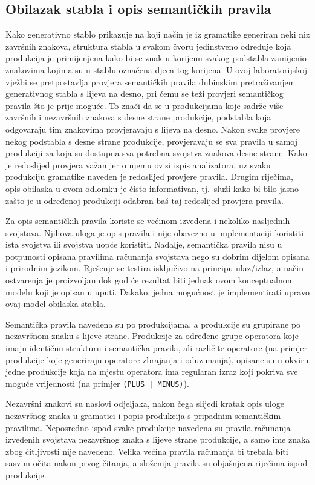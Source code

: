 \documentclass[times, 12pt, utf8]{book}
\begin{document}
\subsection{Obilazak stabla i opis semantičkih pravila}\label{sec:obilazak}
Kako generativno stablo prikazuje na koji način je iz gramatike generiran neki niz završnih znakova, struktura stabla u svakom čvoru jedinstveno određuje koja produkcija je primijenjena kako bi se znak u korijenu svakog podstabla zamijenio znakovima kojima su u stablu označena djeca tog korijena.
U ovoj laboratorijskoj vježbi se pretpostavlja provjera semantičkih pravila dubinskim pretraživanjem generativnog stabla s lijeva na desno, pri čemu se teži provjeri semantičkog pravila što je prije moguće.
To znači da se u produkcijama koje sadrže više završnih i nezavršnih znakova s desne strane produkcije, podstabla koja odgovaraju tim znakovima provjeravaju s lijeva na desno.
Nakon svake provjere nekog podstabla s desne strane produkcije, provjeravaju se sva pravila u samoj produkciji za koja su dostupna sva potrebna svojstva znakova desne strane.
Kako je redoslijed provjera važan jer o njemu ovisi ispis analizatora, uz svaku produkciju gramatike naveden je redoslijed provjere pravila.
Drugim riječima, opis obilaska u ovom odlomku je čisto informativan, tj.~služi kako bi bilo jasno zašto je u određenoj produkciji odabran baš taj redoslijed provjera pravila.

Za opis semantičkih pravila koriste se većinom izvedena i nekoliko nasljednih svojstava.
Njihova uloga je opis pravila i nije obavezno u implementaciji koristiti ista svojstva ili svojstva uopće koristiti.
Nadalje, semantička pravila nisu u potpunosti opisana pravilima računanja svojstava nego su dobrim dijelom opisana i prirodnim jezikom.
Rješenje se testira isključivo na principu ulaz\slash{}izlaz, a način ostvarenja je proizvoljan dok god će rezultat biti jednak ovom konceptualnom modelu koji je opisan u uputi.
Dakako, jedna mogućnost je implementirati upravo ovaj model obilaska stabla.

Semantička pravila navedena su po produkcijama, a produkcije su grupirane po nezavršnom znaku s lijeve strane.
Produkcije za određene grupe operatora koje imaju identičnu strukturu i semantička pravila, ali različite operatore (na primjer produkcije koje generiraju operatore zbrajanja i oduzimanja), opisane su u okviru jedne produkcije koja na mjestu operatora ima regularan izraz koji pokriva sve moguće vrijednosti (na primjer \verb#(PLUS | MINUS)#).

Nezavršni znakovi su naslovi odjeljaka, nakon čega slijedi kratak opis uloge nezavršnog znaka u gramatici i popis produkcija s pripadnim semantičkim pravilima.
Neposredno ispod svake produkcije navedena su pravila računanja izvedenih svojstava nezavršnog znaka s lijeve strane produkcije, a samo ime znaka zbog čitljivosti nije navedeno.
Velika većina pravila računanja bi trebala biti sasvim očita nakon prvog čitanja, a složenija pravila su objašnjena riječima ispod produkcije.
\end{document}
